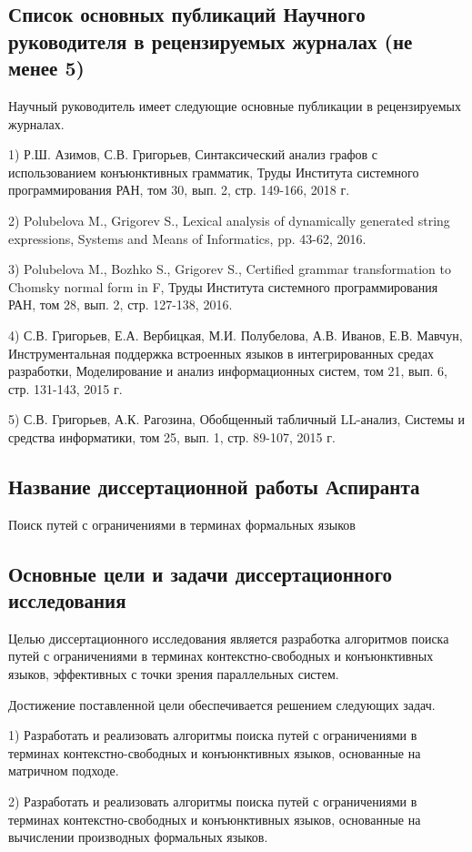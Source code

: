 \documentclass[12pt]{article}  %
\theoremstyle{remark}
\begin{document}
\subsection{Список основных публикаций Научного руководителя в рецензируемых журналах (не менее 5)}
Научный руководитель имеет следующие основные публикации в рецензируемых журналах.

1) Р.Ш. Азимов, С.В. Григорьев, Синтаксический анализ графов с использованием конъюнктивных грамматик, Труды Института системного программирования РАН, том 30, вып. 2, стр. 149-166, 2018 г.

2) Polubelova M., Grigorev S., Lexical analysis of dynamically generated string expressions, Systems and Means of Informatics, pp. 43-62, 2016.

3) Polubelova M., Bozhko S., Grigorev S., Certified grammar transformation to Chomsky normal form in F, Труды Института системного программирования РАН, том 28, вып. 2, стр. 127-138, 2016.

4) С.В. Григорьев, Е.А. Вербицкая, М.И. Полубелова, А.В. Иванов, Е.В. Мавчун, Инструментальная поддержка встроенных языков в интегрированных средах разработки, Моделирование и анализ информационных систем, том 21, вып. 6, стр. 131-143, 2015 г.

5) С.В. Григорьев, А.К. Рагозина, Обобщенный табличный LL-анализ, Системы и средства информатики, том 25, вып. 1, стр. 89-107, 2015 г.
\subsection{Название диссертационной работы Аспиранта}
Поиск путей с ограничениями в терминах формальных языков
\subsection{Основные цели и задачи диссертационного исследования}
Целью диссертационного исследования является разработка алгоритмов поиска путей с ограничениями в терминах контекстно-свободных и конъюнктивных языков, эффективных с точки зрения параллельных систем.

Достижение поставленной цели обеспечивается решением следующих задач.

1) Разработать и реализовать алгоритмы поиска путей с ограничениями в терминах контекстно-свободных и конъюнктивных языков, основанные на матричном подходе.

2) Разработать и реализовать алгоритмы поиска путей с ограничениями в терминах контекстно-свободных и конъюнктивных языков, основанные на вычислении производных формальных языков.
\end{document}
